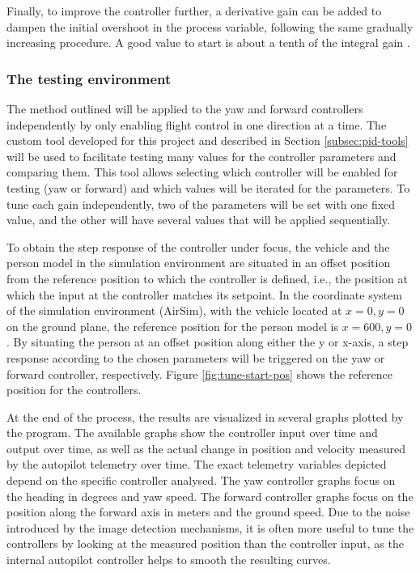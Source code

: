 Finally, to improve the controller further, a derivative gain can be added to dampen the initial overshoot in the process variable, following the same gradually increasing procedure. A good value to start is about a tenth of the integral gain \cite{pid-tuning}. 


\subsubsection{The testing environment}

The method outlined will be applied to the yaw and forward controllers independently by only enabling flight control in one direction at a time.
The custom tool developed for this project and described in Section \ref{subsec:pid-tools} will be used to facilitate testing many values for the controller parameters and comparing them. This tool allows selecting which controller will be enabled for testing (yaw or forward) and which values will be iterated for the parameters. To tune each gain independently, two of the parameters will be set with one fixed value, and the other will have several values that will be applied sequentially.

To obtain the step response of the controller under focus, the vehicle and the person model in the simulation environment are situated in an offset position from the reference position to which the controller is defined, i.e., the position at which the input at the controller matches its setpoint.
In the coordinate system of the simulation environment (AirSim), with the vehicle located at $x=0, y=0$ on the ground plane, the reference position for the person model is $x=600, y=0$. By situating the person at an offset position along either the y or x-axis, a step response according to the chosen parameters will be triggered on the yaw or forward controller, respectively.
Figure \ref{fig:tune-start-pos} shows the reference position for the controllers.

At the end of the process, the results are visualized in several graphs plotted by the program. The available graphs show the controller input over time and output over time, as well as the actual change in position and velocity measured by the autopilot telemetry over time. The exact telemetry variables depicted depend on the specific controller analysed. The yaw controller graphs focus on the heading in degrees and yaw speed. The forward controller graphs focus on the position along the forward axis in meters and the ground speed.
Due to the noise introduced by the image detection mechanisms, it is often more useful to tune the controllers by looking at the measured position than the controller input, as the internal autopilot controller helps to smooth the resulting curves.


